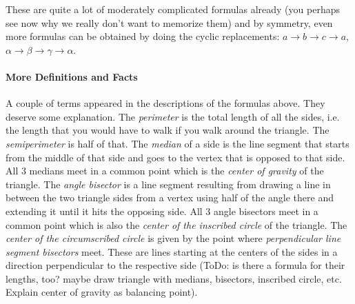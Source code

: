 These are quite a lot of moderately complicated formulas already (you perhaps see now why we really don't want to memorize them) and by symmetry, even more formulas can be obtained by doing the cyclic replacements: $a \rightarrow b \rightarrow c \rightarrow a$, $\alpha \rightarrow \beta \rightarrow \gamma \rightarrow \alpha$. 


\paragraph{More Definitions and Facts}
A couple of terms appeared in the descriptions of the formulas above. They deserve some explanation. The \emph{perimeter} is the total length of all the sides, i.e. the length that you would have to walk if you walk around the triangle. The \emph{semiperimeter} is half of that. The \emph{median} of a side is the line segment that starts from the middle of that side and goes to the vertex that is opposed to that side. All 3 medians meet in a common point which is the \emph{center of gravity} of the triangle. The \emph{angle bisector} is a line segment resulting from drawing a line in between the two triangle sides from a vertex using half of the angle there and extending it until it hits the opposing side. All 3 angle bisectors meet in a common point which is also the \emph{center of the inscribed circle} of the triangle. The \emph{center of the circumscribed circle} is given by the point where \emph{perpendicular line segment bisectors} meet. These are lines starting at the centers of the sides in a direction perpendicular to the respective side (ToDo: is there a formula for their lengths, too? maybe draw triangle with medians, bisectors, inscribed circle, etc. Explain center of gravity as balancing point).



